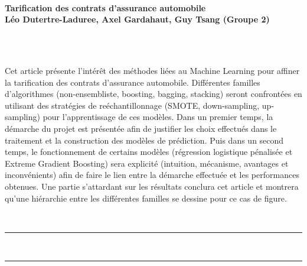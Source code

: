 \documentclass[french]{article}
\makeatletter
\def\vhrulefill#1{\leavevmode\leaders\hrule\@height#1\hfill \kern\z@}
\renewenvironment{abstract} %
 {\par\noindent\textbf{\abstractname}\ \ignorespaces\\}
 {\par\medskip}
\makeatother
\begin{document}
\noindent\begin{minipage}{\textwidth}

\ \\[30pt]

{\LARGE \bf Tarification des contrats d'assurance automobile} \\

{\large \bf Léo Dutertre-Laduree, 
            Axel Gardahaut, 
            Guy Tsang (Groupe 2)}



\end{minipage}

\



\null

\begin{abstract}
Cet article présente l'intérêt des méthodes liées au Machine Learning pour affiner la tarification des contrats d'assurance automobile. Différentes familles d'algorithmes (non-ensembliste, boosting, bagging, stacking) seront confrontées en utilisant des stratégies de reéchantillonnage (SMOTE, down-sampling, up-sampling) pour l'apprentissage de ces modèles. Dans un premier temps, la démarche du projet est présentée afin de justifier les choix effectués dans le traitement et la construction des modèles de prédiction. Puis dans un second temps, le fonctionnement de certains modèles (régression logistique pénalisée et Extreme Gradient Boosting) sera explicité (intuition, mécanisme, avantages et inconvénients) afin de faire le lien entre la démarche effectuée et les performances obtenues. Une partie s'attardant sur les résultats conclura cet article et montrera qu'une hiérarchie entre les différentes familles se dessine pour ce cas de figure.
\end{abstract}


\

\noindent \vhrulefill{1.5pt} ~ ~ \vhrulefill{1.5pt}
\end{document}
